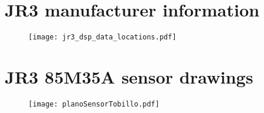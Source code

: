 \chapter{JR3 manufacturer information}\label{app:jr3card}

\begin{figure}[!hbt]
\centering
\texttt{[image: jr3\_dsp\_data\_locations.pdf]}
\end{figure}

\chapter{JR3 85M35A sensor drawings} \label{app:sensorDraw}

\begin{figure}[!hbt]
\centering
\texttt{[image: planoSensorTobillo.pdf]}
\end{figure}